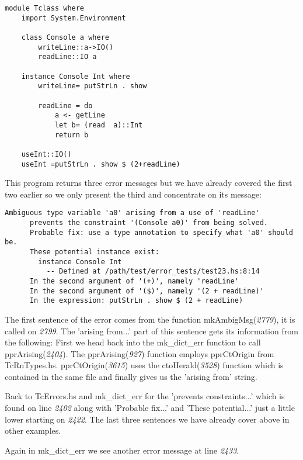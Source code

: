 \documentclass[a4paper]{article}
\begin{document}
\begin{lstlisting}[label={lst: T15.0}, numbers=none, caption={Example Program \cite{ex15}}]
module Tclass where
    import System.Environment

    class Console a where
        writeLine::a->IO()
        readLine::IO a

    instance Console Int where
        writeLine= putStrLn . show 

        readLine = do
            a <- getLine
            let b= (read  a)::Int
            return b

    useInt::IO()
    useInt =putStrLn . show $ (2+readLine)
\end{lstlisting}

This program returns three error messages but we have already covered the first two earlier so we only present the third and concentrate on its message:

\begin{lstlisting}[label={lst: T15.0.2}, numbers=none, caption={Error}]
Ambiguous type variable 'a0' arising from a use of 'readLine'
      prevents the constraint '(Console a0)' from being solved.
      Probable fix: use a type annotation to specify what 'a0' should be.
      These potential instance exist:
        instance Console Int
          -- Defined at /path/test/error_tests/test23.hs:8:14
      In the second argument of '(+)', namely 'readLine'
      In the second argument of '($)', namely '(2 + readLine)'
      In the expression: putStrLn . show $ (2 + readLine)
\end{lstlisting}

The first sentence of the error comes from the function mkAmbigMsg(\textit{2779}), it is called on \textit{2799}. The 'arising from...' part of this sentence gets its information from the following: First we head back into the mk\_dict\_err function to call pprArising(\textit{2404}). The pprArising(\textit{927}) function employs pprCtOrigin from TcRnTypes.hs. pprCtOrigin(\textit{3615}) uses the ctoHerald(\textit{3528}) function which is contained in the same file and finally gives us the 'arising from' string.

Back to TcErrors.hs and mk\_dict\_err for the 'prevents constraints...' which is found on line \textit{2402} along with 'Probable fix...' and 'These potential...' just a little lower starting on \textit{2422}. The last three sentences we have already cover above in other examples.


Again in mk\_dict\_err we see another error message at line \textit{2433}.
\end{document}

